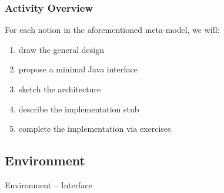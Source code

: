 \documentclass[presentation]{beamer}\mode<presentation>{\usetheme{AMSCesenaPurpleAndGold}}
\begin{document}
\begin{frame}%
	\frametitle{Activity Overview}
	
	For each notion in the aforementioned meta-model, we will:
	\vfill
	\begin{enumerate}
		\item draw the general design
		
		\vfill
		
		\item propose a minimal Java interface
		
		\vfill
		
		\item sketch the architecture
		
		\vfill
		
		\item describe the implementation stub
		
		\vfill
		
		\item complete the implementation via exercises
	\end{enumerate}
	
\end{frame}

\subsection{Environment}

\begin{frame}[allowframebreaks]{Environment -- Interface}
    
    
    
\end{frame}
\end{document}
